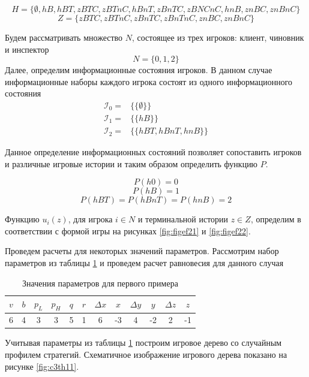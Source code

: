 \begin{equation*}
	H = \{\emptyset, hB, hBT, zBTC, zBTnC, hBnT, zBnTC, zBNCnC, hnB, znBC, znBnC\}
\end{equation*}
\begin{equation*}
	Z = \{zBTC, zBTnC, zBnTC, zBnTnC, znBC, znBnC\}
\end{equation*}
\par
Будем рассматривать множество $N$, состоящее из трех игроков: клиент, чиновник и инспектор
\begin{equation*}
	N = \{0, 1, 2\}
\end{equation*}
Далее, определим информационные состояния игроков. В данном случае информационные наборы каждого игрока состоят из одного информационного состояния
\begin{align*}
	\mathcal{I}_0 = & \{\{\emptyset\}\} \\
	\mathcal{I}_1 = & \{\{hB\}\} \\
	\mathcal{I}_2 = & \{\{hBT, hBnT, hnB\}\}
\end{align*}
\par
Данное определение информационных состояний позволяет сопоставить игроков и различные игровые истории и таким образом определить функцию $P$.

$$P(h0) = 0$$
$$P(hB)=1$$
$$P(hBT)=P(hBnT)=P(hnB)=2$$

Функцию $u_i(z)$, для игрока $i \in N$ и терминальной истории $z \in Z$, определим  в соответствии с формой игры на рисунках \ref{fig:figef21} и \ref{fig:figef22}.

Проведем расчеты для некоторых значений параметров. Рассмотрим набор параметров из таблицы \ref{tbl:s1_1} и проведем расчет равновесия для данного случая

\begin{table}[H]
	\centering
	\begin{tabular}[t]{|c|c|c|c|c|c|c|c|c|c|c|c|}
		\hline
		$v$ &	$b$ & $p_L$ &	$p_H$ & $q$ & $r$ & $\Delta x$ & $x$ & $\Delta y$ & $y$ & $\Delta z$ & $z$ \\
		\hline
		6 &	4 & 3 &	3 & 5 & 1 & 6 & -3 & 4 & -2 & 2 & -1 \\
		\hline
	\end{tabular}
	\caption{\centering Значения параметров для первого примера}
	\label{tbl:s1_1}
\end{table}
\par
Учитывая параметры из таблицы \ref{tbl:s1_1} построим игровое дерево со случайным профилем стратегий. Схематичное изображение игрового дерева показано на рисунке \ref{fig:c3th11}.

